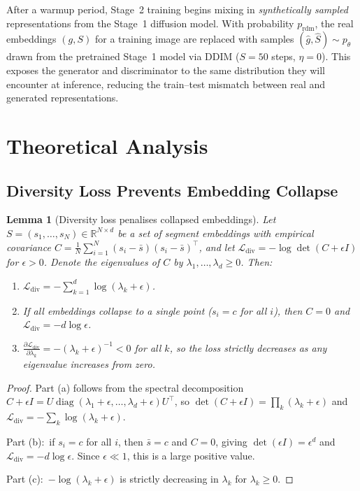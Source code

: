 \documentclass[12pt]{article}
\newtheorem{lemma}[theorem]{Lemma}
\DeclareMathOperator{\diag}{diag}
\begin{document}
After a warmup period, Stage~2 training begins mixing in
\emph{synthetically sampled} representations from the Stage~1 diffusion
model.
With probability $p_{\mathrm{rdm}}$, the real embeddings $(g, S)$
for a training image are replaced with samples
$(\hat{g}, \hat{S}) \sim p_\theta$ drawn from the pretrained
Stage~1 model via DDIM ($S = 50$ steps, $\eta = 0$).
This exposes the generator and discriminator to the same distribution
they will encounter at inference, reducing the train--test mismatch
between real and generated representations.

\section{Theoretical Analysis}
\label{sec:theory}

\subsection{Diversity Loss Prevents Embedding Collapse}

\begin{lemma}[Diversity loss penalises collapsed embeddings]
\label{lem:div-collapse}
Let $S = (s_1, \ldots, s_N) \in \mathbb{R}^{N \times d}$ be a set of
segment embeddings with empirical covariance
$C = \frac{1}{N}\sum_{i=1}^{N}(s_i - \bar{s})(s_i - \bar{s})^\top$,
and let $\mathcal{L}_{\mathrm{div}} = -\log\det(C + \epsilon I)$
for $\epsilon > 0$.
Denote the eigenvalues of $C$ by $\lambda_1, \ldots, \lambda_d \geq 0$.
Then:
\begin{enumerate}
    \item[(a)] $\mathcal{L}_{\mathrm{div}} = -\sum_{k=1}^{d} \log(\lambda_k + \epsilon)$.
    \item[(b)] If all embeddings collapse to a single point
    ($s_i = c$ for all $i$), then $C = 0$ and
    $\mathcal{L}_{\mathrm{div}} = -d\log\epsilon$.
    \item[(c)] $\frac{\partial \mathcal{L}_{\mathrm{div}}}{\partial \lambda_k}
    = -(\lambda_k + \epsilon)^{-1} < 0$ for all $k$,
    so the loss strictly decreases as any eigenvalue increases from zero.
\end{enumerate}
\end{lemma}

\begin{proof}
Part (a) follows from the spectral decomposition
$C + \epsilon I = U \diag(\lambda_1 + \epsilon, \ldots, \lambda_d + \epsilon) U^\top$,
so $\det(C + \epsilon I) = \prod_{k}(\lambda_k + \epsilon)$ and
$\mathcal{L}_{\mathrm{div}} = -\sum_{k}\log(\lambda_k + \epsilon)$.

Part (b):\ if $s_i = c$ for all $i$, then $\bar{s} = c$ and $C = 0$,
giving $\det(\epsilon I) = \epsilon^d$ and
$\mathcal{L}_{\mathrm{div}} = -d\log\epsilon$.
Since $\epsilon \ll 1$, this is a large positive value.

Part (c):\ $-\log(\lambda_k + \epsilon)$ is strictly decreasing in
$\lambda_k$ for $\lambda_k \geq 0$.
\end{proof}
\end{document}
